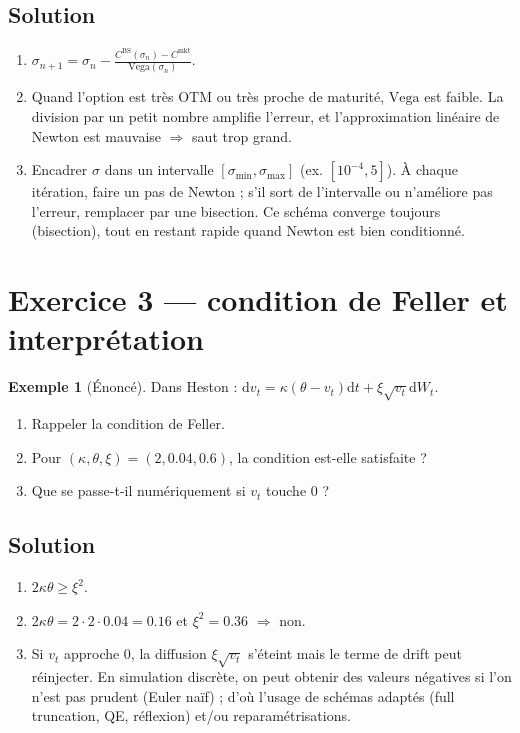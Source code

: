 \documentclass[11pt,a4paper]{report}
\newcommand{\dd}{\mathrm{d}}
\newcommand{\1}{\mathbbm{1}}
\newcommand{\vega}{\mathrm{Vega}}
\theoremstyle{definition}
\newtheorem{example}{Exemple}[chapter]
\theoremstyle{plain}
\theoremstyle{remark}
\begin{document}
\subsection*{Solution}
\begin{enumerate}[label=\alph*)]
  \item $\sigma_{n+1}=\sigma_n-\frac{C^{\mathrm{BS}}(\sigma_n)-C^{\mathrm{mkt}}}{\vega(\sigma_n)}$.
  \item Quand l'option est très OTM ou très proche de maturité, $\vega$ est faible.
  La division par un petit nombre amplifie l'erreur, et l'approximation linéaire de Newton est mauvaise $\Rightarrow$ saut trop grand.
  \item Encadrer $\sigma$ dans un intervalle $[\sigma_{\min},\sigma_{\max}]$ (ex. $[10^{-4},5]$).
  À chaque itération, faire un pas de Newton ; s'il sort de l'intervalle ou n'améliore pas l'erreur, remplacer par une bisection.
  Ce schéma converge toujours (bisection), tout en restant rapide quand Newton est bien conditionné.
\end{enumerate}

\section{Exercice 3 --- condition de Feller et interprétation}
\begin{example}[Énoncé]
Dans Heston : $\dd v_t=\kappa(\theta-v_t)\dd t+\xi\sqrt{v_t}\dd W_t$.
\begin{enumerate}[label=\alph*)]
  \item Rappeler la condition de Feller.
  \item Pour $(\kappa,\theta,\xi)=(2,0.04,0.6)$, la condition est-elle satisfaite ?
  \item Que se passe-t-il numériquement si $v_t$ touche 0 ?
\end{enumerate}
\end{example}

\subsection*{Solution}
\begin{enumerate}[label=\alph*)]
  \item $2\kappa\theta\ge \xi^2$.
  \item $2\kappa\theta=2\cdot 2\cdot 0.04=0.16$ et $\xi^2=0.36$ $\Rightarrow$ non.
  \item Si $v_t$ approche 0, la diffusion $\xi\sqrt{v_t}$ s'éteint mais le terme de drift peut réinjecter.
  En simulation discrète, on peut obtenir des valeurs négatives si l'on n'est pas prudent (Euler naïf) ; d'où l'usage de schémas adaptés (full truncation, QE, réflexion) et/ou reparamétrisations.
\end{enumerate}
\end{document}
